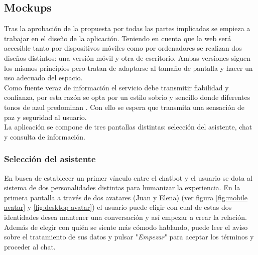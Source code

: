 
\subsection{Mockups}
\label{mockups}
Tras la aprobación de la propuesta por todas las partes implicadas se empieza a trabajar en el diseño de la aplicación. Teniendo en cuenta que la web será accesible tanto por dispositivos móviles como por ordenadores se realizan dos diseños distintos: una versión móvil y otra de escritorio. Ambas versiones siguen los mismos principios pero tratan de adaptarse al tamaño de pantalla y hacer un uso adecuado del espacio.\\

Como fuente veraz de información el servicio debe transmitir fiabilidad y confianza, por esta razón se opta por un estilo sobrio y sencillo donde diferentes tonos de azul predominan \cite{colors}. Con ello se espera que transmita una sensación de paz y seguridad al usuario.\\

La aplicación se compone de tres pantallas distintas: selección del asistente, chat y consulta de información.\\

\subsubsection{Selección del asistente}
En busca de establecer un primer vínculo entre el chatbot y el usuario se dota al sistema de dos personalidades distintas para humanizar la experiencia. En la primera pantalla a través de dos avatares (Juan y Elena) (ver figura \ref{fig:mobile avatar} y \ref{fig:desktop avatar}) el usuario puede eligir con cual de estas dos identidades desea mantener una conversación y así empezar a crear la relación. Además de elegir con quién se siente más cómodo hablando, puede leer el aviso sobre el tratamiento de sus datos y pulsar "\textit{Empezar}" para aceptar los términos y proceder al chat.\\

